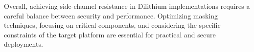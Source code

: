 Overall, achieving side-channel resistance in Dilithium implementations requires a careful balance between security and performance. Optimizing masking techniques, focusing on critical components, and considering the specific constraints of the target platform are essential for practical and secure deployments.
